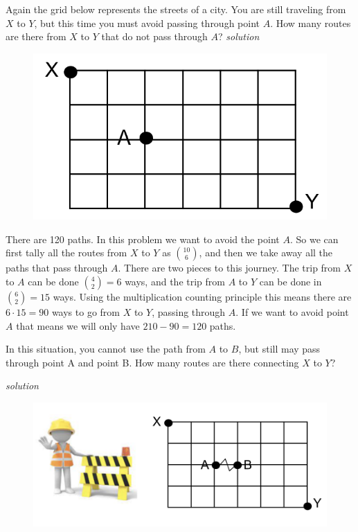 \documentclass{amsbook}
\begin{document}
\begin{Exercise}[title={Paths on a Grid II}, difficulty=2, label=c2]
    Again the grid below represents the streets of a city. You are still traveling from $X$ to $Y$, but this time you must avoid passing through point $A$. How many routes are there from $X$ to $Y$ that do not pass through $A$? \hfill \emph{solution} 
    \begin{figure}[H]
     \centering
        \includegraphics[scale=.55]{c.png}
    \end{figure}
\end{Exercise}

\begin{Answer}[ref={c2}]
    There are 120 paths. In this problem we want to avoid the point $A$. So we can first tally all the routes from $X$ to $Y$ as $10 \choose 6$, and then we take away all the paths that pass through $A$. There are two pieces to this journey. The trip from $X$ to $A$ can be done ${4 \choose 2} = 6$ ways, and the trip from $A$ to $Y$ can be done in ${6 \choose 2} =15$ ways. Using the multiplication counting principle this means there are $6\cdot 15 =90$ ways to go from $X$ to $Y$, passing through $A$. If we want to avoid point $A$ that means we will only have $210-90=120$ paths.
\end{Answer}

\begin{Exercise}[title={Paths on a Grid III}, difficulty=2, label=c3]
    In this situation, you cannot use the path from $A$ to $B$, but still may pass through point A and point B. How many routes are there connecting $X$ to $Y$? 
    
    \hfill \emph{solution} 
    \begin{figure}[H]
        \includegraphics[width=.6\linewidth]{d.png}
    \end{figure}
\end{Exercise}
\end{document}

